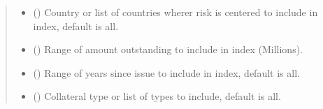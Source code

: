 \documentclass[letterpaper,10pt,english]{report}
\begin{document}
\begin{fulllineitems}
\begin{fulllineitems}
\begin{quote}
\begin{description}
\begin{itemize}
\item {} 
 (\sphinxstyleliteralemphasis{\sphinxupquote{, }}\sphinxstyleliteralemphasis{\sphinxupquote{{[}}}\sphinxstyleliteralemphasis{\sphinxupquote{{]}}}\sphinxstyleliteralemphasis{\sphinxupquote{, }}) \textendash{} Country or list of countries wherer risk is centered to include
in index, default is all.

\item {} 
 (\sphinxstyleliteralemphasis{\sphinxupquote{{[}}}\sphinxstyleliteralemphasis{\sphinxupquote{, }}\sphinxstyleliteralemphasis{\sphinxupquote{{]}}}\sphinxstyleliteralemphasis{\sphinxupquote{, }}\sphinxstyleliteralemphasis{\sphinxupquote{(}}\sphinxstyleliteralemphasis{\sphinxupquote{, }}\sphinxstyleliteralemphasis{\sphinxupquote{)}}\sphinxstyleliteralemphasis{\sphinxupquote{}}) \textendash{} Range of amount outstanding to include in index (Millions).

\item {} 
 (\sphinxstyleliteralemphasis{\sphinxupquote{{[}}}\sphinxstyleliteralemphasis{\sphinxupquote{, }}\sphinxstyleliteralemphasis{\sphinxupquote{{]}}}\sphinxstyleliteralemphasis{\sphinxupquote{, }}\sphinxstyleliteralemphasis{\sphinxupquote{(}}\sphinxstyleliteralemphasis{\sphinxupquote{, }}\sphinxstyleliteralemphasis{\sphinxupquote{)}}\sphinxstyleliteralemphasis{\sphinxupquote{}}) \textendash{} Range of years since issue to include in index, default is all.

\item {} 
 (\sphinxstyleliteralemphasis{\sphinxupquote{, }}\sphinxstyleliteralemphasis{\sphinxupquote{{[}}}\sphinxstyleliteralemphasis{\sphinxupquote{{]}}}\sphinxstyleliteralemphasis{\sphinxupquote{, }}) \textendash{} Collateral type or list of types to include, default is all.


\end{itemize}
\end{description}
\end{quote}
\end{fulllineitems}
\end{fulllineitems}
\end{document}
